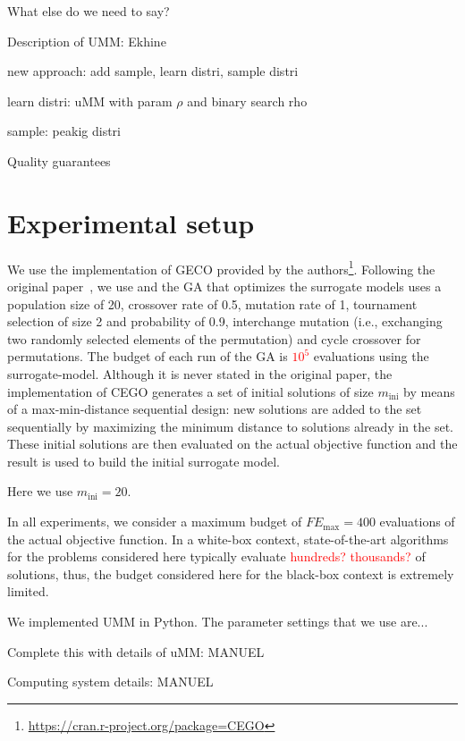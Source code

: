 \documentclass[runningheads]{llncs}
\begin{document}
What else do we need to say?

\newcommand{\minit}{\ensuremath{m_\text{ini}}\xspace}

\newcommand{\FEmax}{\ensuremath{FE_{\max}}}

Description of UMM: Ekhine

new approach: add sample, learn distri, sample distri

learn distri: uMM with param $\rho$ and binary search rho

sample: peakig distri

Quality guarantees


\section{Experimental setup}

We use the implementation of GECO provided by the
authors\footnote{\url{https://cran.r-project.org/package=CEGO}}. Following the
original paper~\citep{ZaeStoFriFisNauBar2014}, we use and the GA that optimizes
the surrogate models uses a population size of 20, crossover rate of 0.5,
mutation rate of 1, tournament selection of size 2 and probability of 0.9,
interchange mutation (i.e., exchanging two randomly selected elements of the
permutation) and cycle crossover for permutations. The budget of each run of
the GA is \textcolor{red}{$10^5$} evaluations using the
surrogate-model. Although it is never stated in the original paper, the
implementation of CEGO generates a set of initial solutions of size \minit by
means of a max-min-distance sequential design: new solutions are added to the
set sequentially by maximizing the minimum distance to solutions already in the
set. These initial solutions are then evaluated on the actual objective
function and the result is used to build the initial surrogate model.

Here we use $\minit=20$.

In all experiments, we consider a maximum budget of $\FEmax=400$ evaluations of
the actual objective function. In a white-box context, state-of-the-art
algorithms for the problems considered here typically evaluate
\textcolor{red}{hundreds? thousands?} of solutions, thus, the budget considered
here for the black-box context is extremely limited.

We implemented UMM in Python. The parameter settings that we use are...

Complete this with details of uMM: MANUEL

Computing system details: MANUEL
\end{document}
